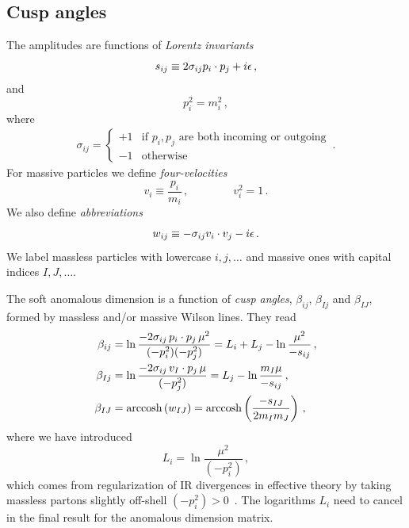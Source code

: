 \documentclass[a4paper,11pt]{report}
\numberwithin{equation}{section}
\begin{document}
\subsection{Cusp angles}

The amplitudes are functions of \emph{Lorentz invariants}~\cite{Becher:2009kw}
%
\begin{equation}
  s_{ij} \equiv 2 \sigma_{ij} p_i \cdot p_j + i \epsilon\,,
  \label{eq:sij-def}
\end{equation}
%
and
\begin{equation}
  p_i^2 = m_i^2\,,
\end{equation}
%
where
%
\begin{eqnarray}
  \sigma_{ij} = \left\{
    \begin{array}{cl} 
      + 1 &  \text{if } p_i, p_j \text{ are both incoming or outgoing} \\
      - 1 &  \text{otherwise}
    \end{array}
    \right.\,.
\end{eqnarray}
%
For massive particles we define \emph{four-velocities}
%
\begin{equation}
  v_i \equiv  \frac{p_i}{m_i}\,,
  \qquad \qquad v_i^2 = 1\,.
\end{equation}
%
We also define \emph{abbreviations}
%
\begin{equation}
  w_{ij} \equiv - \sigma_{ij} v_i \cdot v_j - i \epsilon\,.
\end{equation}
%
We label massless particles with lowercase $i, j, \ldots$ and massive
ones with capital indices $I, J, \ldots$.

The soft anomalous dimension is a function of \emph{cusp angles}, $\beta_{ij}$, 
$\beta_{Ij}$ and $\beta_{IJ}$, formed by massless and/or massive Wilson lines. They
read~\cite{Becher:2009kw}
%
\begin{subequations}
  \begin{align}
    \beta_{ij} & = 
    \ln \frac{-2 \sigma_{ij}\, p_i \cdot p_j\, \mu^2}{(-p_i^2)(-p_j^2)} =
    L_i + L_j - \ln\frac{\mu^2}{-s_{ij}}\,,
    \\
    \beta_{Ij} & = 
    \ln \frac{-2 \sigma_{ij}\, v_I \cdot p_j\, \mu}{(-p_j^2)} =
    L_j - \ln\frac{m_I \mu}{-s_{ij}}\,,
    \\
   \label{eq:betaIJ-def}
    \beta_{IJ} & =  {\rm arccosh} \left(w_{IJ}\right) = 
                    {\rm arccosh} \left(\frac{-s_{IJ}}{2 m_I m_J}\right)\,,
  \end{align}
\end{subequations}
%
where we have introduced
%
\begin{equation}
  L_i = \ln \frac{\mu^2}{(-p_i^2)}\,,
\end{equation}
%
which comes from regularization of IR divergences in effective theory by taking
massless partons slightly off-shell $(-p_i^2) > 0$~\cite{Becher:2009qa}. The
logarithms $L_i$ need to cancel in the final result for the anomalous dimension
matrix.
\end{document}
